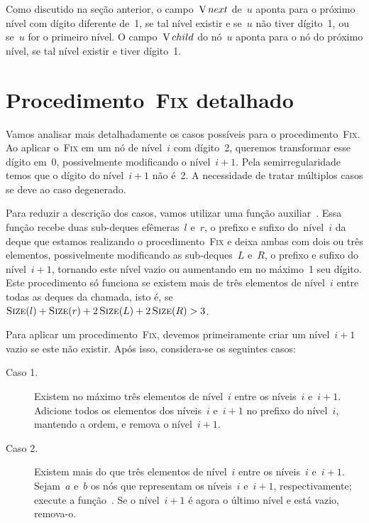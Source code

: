 \documentclass[../../main.tex]{subfiles}
\begin{document}
Como discutido na seção anterior, o campo~$\operatorname{V}{next}$ de~$u$ aponta para o próximo nível com dígito diferente de~1, se tal nível existir e se~$u$ não tiver dígito~1, ou se~$u$ for o primeiro nível. O campo~$\operatorname{V}{child}$ do nó~$u$ aponta para o nó do próximo nível, se tal nível existir e tiver dígito~1.

\section{Procedimento~{\normalfont \textsc{Fix}} detalhado} \label{sec:fix_det}

Vamos analisar mais detalhadamente os casos possíveis para o procedimento~\textsc{Fix}. Ao aplicar o~\textsc{Fix} em um nó de nível~$i$ com dígito~2, queremos transformar esse dígito em~0, possivelmente modificando o nível~$i+1$. Pela semirregularidade temos que o dígito do nível~${i+1}$ não é~2. A necessidade de tratar múltiplos casos se deve ao caso degenerado.

Para reduzir a descrição dos casos, vamos utilizar uma função auxiliar~. Essa função recebe duas sub-deques efêmeras~$l$ e~$r$, o prefixo e sufixo do~nível~$i$ da deque que estamos realizando o procedimento~\textsc{Fix} e deixa ambas com dois ou três elementos, possivelmente modificando as sub-deques~$L$ e~$R$, o prefixo e sufixo do nível~${i+1}$, tornando este nível vazio ou aumentando em no máximo~1 seu dígito. Este procedimento só funciona se existem mais de três elementos de nível~$i$ entre todas as deques da chamada, isto é, se~${\Call{Size}{l} + \Call{Size}{r} + 2\,\Call{Size}{L} + 2\,\Call{Size}{R} > 3}$.

Para aplicar um procedimento~\textsc{Fix}, devemos primeiramente criar um nível~$i+1$ vazio se este não existir. Após isso, considera-se os seguintes casos:

\begin{description}
    \item[Caso 1.] Existem no máximo três elementos de nível~$i$ entre os níveis~$i$ e~$i+1$. \\ Adicione todos os elementos dos níveis~$i$ e~${i+1}$ no prefixo do nível~$i$, mantendo a ordem, e remova o nível~$i+1$.
    \item[Caso 2.] Existem mais do que três elementos de nível~$i$ entre os níveis~$i$ e~${i+1}$. \\ Sejam~$a$ e~$b$ os nós que representam os níveis~$i$ e~${i+1}$, respectivamente; execute a função~. Se o nível~$i+1$ é agora o último nível e está vazio, remova-o.
\end{description}
\end{document}
